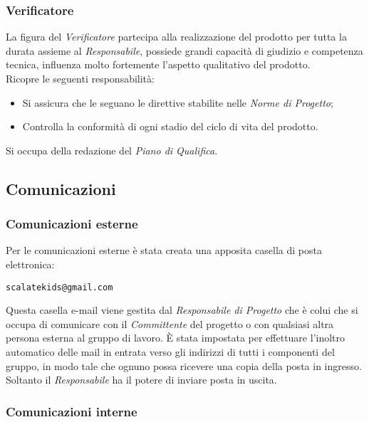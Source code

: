 \documentclass{scalatekids-article}
\begin{document}
\subsubsection{Verificatore}

La figura del \textit{Verificatore} partecipa alla realizzazione del prodotto per
tutta la durata assieme al \textit{Responsabile}, possiede grandi capacità di
giudizio e competenza tecnica, influenza molto fortemente l'aspetto qualitativo
del prodotto.\\ Ricopre le seguenti responsabilità:
\begin{itemize}
\item Si assicura che le  seguano le direttive stabilite nelle \textit{Norme di Progetto};
\item Controlla la conformità di ogni stadio del ciclo di vita del prodotto.
\end{itemize}
Si occupa della redazione del \textit{Piano di Qualifica}.

\subsection{Comunicazioni}

\subsubsection{Comunicazioni esterne}

Per le comunicazioni esterne è stata creata una apposita casella di posta elettronica:
\begin{center}
  \verb=scalatekids@gmail.com=
\end{center}
Questa casella e-mail viene gestita dal \textit{Responsabile di Progetto} che è
colui che si occupa di comunicare con il \textit{Committente} del progetto o con
qualsiasi altra persona esterna al gruppo di lavoro. È stata impostata per
effettuare l'inoltro automatico delle mail in entrata verso gli indirizzi
di tutti i componenti del gruppo, in modo tale che ognuno possa ricevere una
copia della posta in ingresso. Soltanto il \textit{Responsabile} ha il
potere di inviare posta in uscita.

\subsubsection{Comunicazioni interne}
\end{document}
